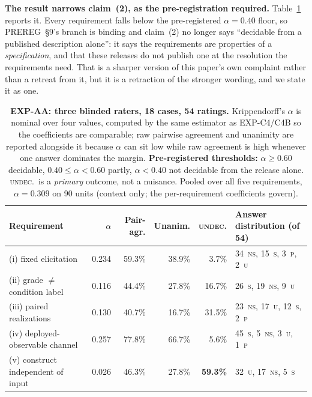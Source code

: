 \textbf{The result narrows claim~(2), as the pre-registration required.}
Table~\ref{tab:audit_agreement} reports it. Every requirement falls below the pre-registered
$\alpha\!=\!0.40$ floor, so PREREG~§9's branch is binding and claim~(2) no longer says
``decidable from a published description alone'': it says the requirements are properties of a
\emph{specification}, and that these releases do not publish one at the resolution the requirements need.
That is a sharper version of this paper's own complaint rather than a retreat from it, but it is a
retraction of the stronger wording, and we state it as one.

\begin{table}[htbp]
\centering
\caption{\small\textbf{EXP-AA: three blinded raters, 18 cases, 54 ratings.} Krippendorff's $\alpha$ is
nominal over four values, computed by the same estimator as EXP-C4/C4B so the coefficients are comparable;
raw pairwise agreement and unanimity are reported alongside it because $\alpha$ can sit low while raw
agreement is high whenever one answer dominates the margin. \textbf{Pre-registered thresholds:}
$\alpha\!\geq\!0.60$ decidable, $0.40\!\leq\!\alpha\!<\!0.60$ partly, $\alpha\!<\!0.40$ not decidable from
the release alone. \textsc{undec.}~is a \emph{primary} outcome, not a nuisance. Pooled over all five
requirements, $\alpha\!=\!0.309$ on 90 units (context only; the per-requirement coefficients govern).}
\label{tab:audit_agreement}
\begin{scriptsize}
\setlength{\tabcolsep}{5pt}
\begin{tabular}{@{}lrrrrl@{}}
\toprule
\textbf{Requirement} & \textbf{$\alpha$} & \textbf{Pair-agr.} & \textbf{Unanim.} & \textbf{\textsc{undec.}} & \textbf{Answer distribution (of 54)} \\
\midrule
(i) fixed elicitation & 0.234 & 59.3\% & 38.9\% & 3.7\% & 34~\textsc{ns}, 15~\textsc{s}, 3~\textsc{p}, 2~\textsc{u} \\
(ii) grade $\neq$ condition label & 0.116 & 44.4\% & 27.8\% & 16.7\% & 26~\textsc{s}, 19~\textsc{ns}, 9~\textsc{u} \\
(iii) paired realizations & 0.130 & 40.7\% & 16.7\% & 31.5\% & 23~\textsc{ns}, 17~\textsc{u}, 12~\textsc{s}, 2~\textsc{p} \\
(iv) deployed-observable channel & 0.257 & 77.8\% & 66.7\% & 5.6\% & 45~\textsc{s}, 5~\textsc{ns}, 3~\textsc{u}, 1~\textsc{p} \\
(v) construct independent of input & 0.026 & 46.3\% & 27.8\% & \textbf{59.3\%} & 32~\textsc{u}, 17~\textsc{ns}, 5~\textsc{s} \\
\bottomrule
\end{tabular}
\end{scriptsize}
\end{table}

